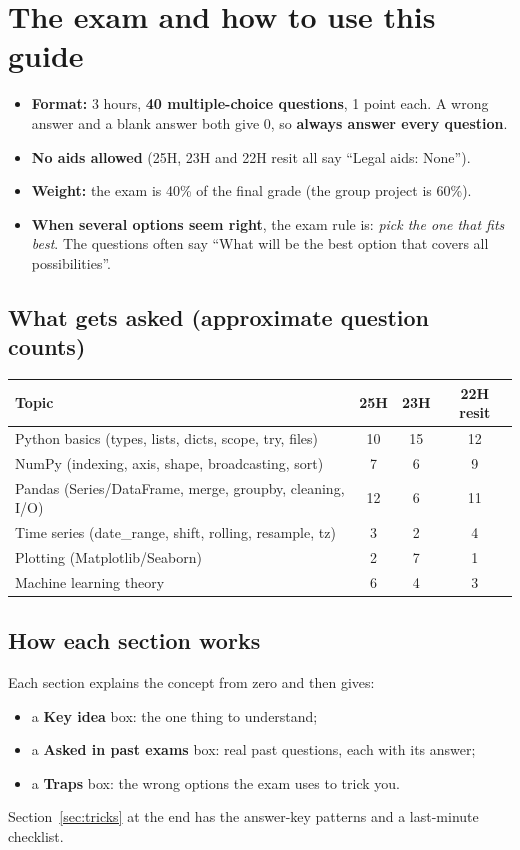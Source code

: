 \section{The exam and how to use this guide}

\begin{itemize}
  \item \textbf{Format:} 3 hours, \textbf{40 multiple-choice questions}, 1 point each. A wrong answer and a blank answer both give 0, so \textbf{always answer every question}.
  \item \textbf{No aids allowed} (25H, 23H and 22H resit all say ``Legal aids: None'').
  \item \textbf{Weight:} the exam is 40\% of the final grade (the group project is 60\%).
  \item \textbf{When several options seem right}, the exam rule is: \emph{pick the one that fits best}. The questions often say ``What will be the best option that covers all possibilities''.
\end{itemize}

\subsection*{What gets asked (approximate question counts)}
\begin{center}
\begin{tabular}{lccc}
\toprule
Topic & 25H & 23H & 22H resit \\ \midrule
Python basics (types, lists, dicts, scope, try, files) & 10 & 15 & 12 \\
NumPy (indexing, axis, shape, broadcasting, sort) & 7 & 6 & 9 \\
Pandas (Series/DataFrame, merge, groupby, cleaning, I/O) & 12 & 6 & 11 \\
Time series (date\_range, shift, rolling, resample, tz) & 3 & 2 & 4 \\
Plotting (Matplotlib/Seaborn) & 2 & 7 & 1 \\
Machine learning theory & 6 & 4 & 3 \\ \bottomrule
\end{tabular}
\end{center}

\subsection*{How each section works}
Each section explains the concept from zero and then gives:
\begin{itemize}
  \item a \colorbox{ideabg}{\textbf{Key idea}} box: the one thing to understand;
  \item a {\color{exambar}\textbf{Asked in past exams}} box: real past questions, each with its answer;
  \item a \colorbox{trapbg}{\textbf{Traps}} box: the wrong options the exam uses to trick you.
\end{itemize}
Section~\ref{sec:tricks} at the end has the answer-key patterns and a last-minute checklist.
